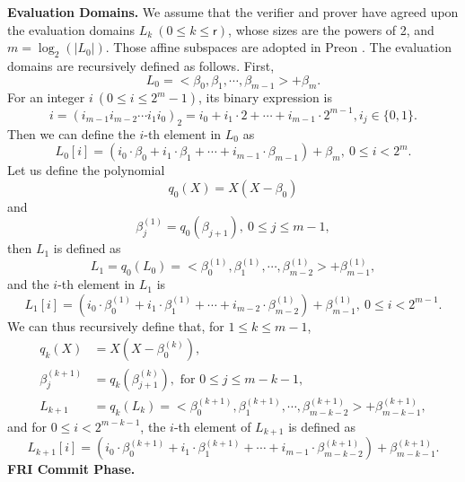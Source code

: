 \noindent\textbf{Evaluation Domains.} We assume that the verifier and prover have agreed upon the evaluation domains $L_k\ (0\le k \le \mathsf{r})$, whose sizes are the powers of 2,  and $m = \log_2(|L_0|)$. Those affine subspaces are adopted in Preon \cite{Preon2023}.  The evaluation domains are recursively defined as follows. First,
\begin{equation}
	L_0 = <\beta_{0},\beta_{1},\cdots, \beta_{m-1}> + \beta_{m}.
\end{equation}
For an integer $i\ (0\le i \le 2^{m} - 1)$, its binary expression is 
\[i = (i_{m-1}i_{m-2}\cdots i_1i_0)_2 = i_0 + i_1\cdot 2 + \cdots + i_{m-1}\cdot 2^{m-1}, i_j \in \{0,1\}.\]
Then we can define the $i$-th element in $L_0$ as
\begin{equation}
	L_0[i] = (i_0\cdot\beta_0 + i_1\cdot\beta_1+ \cdots + i_{m-1}\cdot\beta_{m-1}) + \beta_{m},\ 0\le i < 2^m.
\end{equation}
Let us define the polynomial
\begin{equation}
	q_0(X) = X(X - \beta_0)
\end{equation}
and \[\beta_j^{(1)} = q_{0}(\beta_{j+1}),\ 0\le j \le m-1,\]
then $L_1$ is defined as
\begin{equation}
	L_1 = q_0(L_0) = <\beta_0^{(1)}, \beta_1^{(1)}, \cdots, \beta_{m-2}^{(1)} > + \beta_{m-1}^{(1)},
\end{equation}
and the $i$-th element in $L_1$ is 
\[L_1[i] =(i_0\cdot\beta_0^{(1)} + i_1\cdot\beta_1^{(1)}+ \cdots + i_{m-2 }\cdot\beta_{m-2}^{(1)}) + \beta_{m-1}^{(1)},\ 0\le i < 2^{m-1}. \]
We can thus recursively define that, { for } $1\le k \le m-1$, 
\begin{equation}
	\begin{aligned}
		q_k(X) &= X(X - \beta_0^{(k)}),\\
		\beta_j^{(k+1)} &= q_{k}(\beta_{j+1}^{(k)}), \text{ for } 0\le j \le m-k-1,\\
		L_{k+1} &= q_k(L_k) = <\beta_0^{(k+1)}, \beta_1^{(k+1)}, \cdots, \beta_{m-k-2}^{(k+1)} > + \beta_{m-k-1}^{(k+1)},
	\end{aligned}
\end{equation}
and for $ 0\le i < 2^{m-k-1}$, the $i$-th element of $L_{k+1}$ is defined as
\begin{equation*}
	L_{k+1}[i] =(i_0\cdot\beta_0^{(k+1)} + i_1\cdot\beta_1^{(k+1)}+ \cdots + i_{m-1}\cdot\beta_{m-k-2}^{(k+1)}) + \beta_{m-k-1}^{(k+1)}. 
\end{equation*}
\newline
\noindent\textbf{FRI Commit Phase.}


